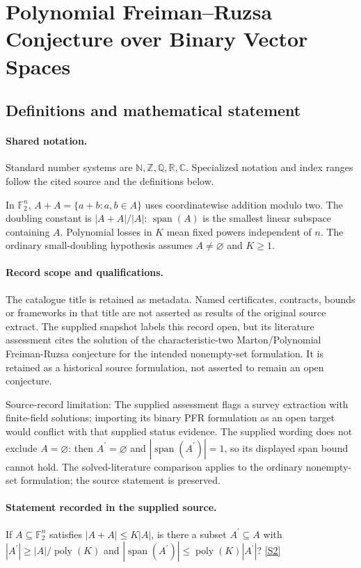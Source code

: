 \documentclass[11pt]{article}
\newcommand{\sref}[2]{\hyperlink{source:#1:#2}{[S#2]}}
\begin{document}
\section{Polynomial Freiman–Ruzsa Conjecture over Binary Vector Spaces}\label{statement}

\subsection{Definitions and mathematical statement}

\paragraph{Shared notation.}Standard number systems are $\mathbb N,\mathbb Z,\mathbb Q,\mathbb R,\mathbb C$. Specialized notation and index ranges follow the cited source and the definitions below.


In $\mathbb F_2^n$, $A+A=\{a+b:a,b\in A\}$ uses coordinatewise addition modulo two. The doubling constant is $|A+A|/|A|$; $\operatorname{span}(A)$ is the smallest linear subspace containing $A$. Polynomial losses in $K$ mean fixed powers independent of $n$. The ordinary small-doubling hypothesis assumes $A\ne\varnothing$ and $K\ge1$.
\paragraph{Record scope and qualifications.}
The catalogue title is retained as metadata. Named certificates, contracts, bounds or frameworks in that title are not asserted as results of the original source extract.
The supplied snapshot labels this record open, but its literature assessment cites the solution of the characteristic-two Marton/Polynomial Freiman-Ruzsa conjecture for the intended nonempty-set formulation. It is retained as a historical source formulation, not asserted to remain an open conjecture.

Source-record limitation: The supplied assessment flags a survey extraction with finite-field solutions; importing its binary PFR formulation as an open target would conflict with that supplied status evidence. The supplied wording does not exclude $A=\varnothing$: then $A^{\prime}=\varnothing$ and $|\operatorname{span}(A^{\prime})|=1$, so its displayed span bound cannot hold. The solved-literature comparison applies to the ordinary nonempty-set formulation; the source statement is preserved.
\paragraph{Statement recorded in the supplied source.}
If $A\subseteq\mathbb F_2^n$ satisfies $|A+A|\leq K|A|$, is there a subset $A^{\prime}\subseteq A$ with $|A^{\prime}|\geq |A|/\operatorname{poly}(K)$ and $|\operatorname{span}(A^{\prime})|\leq\operatorname{poly}(K)|A^{\prime}|$? \sref{statement}{2}
\end{document}
